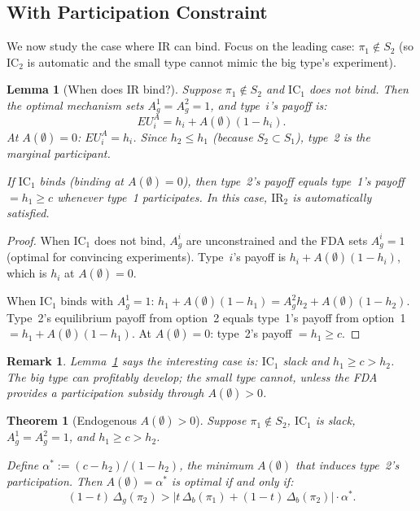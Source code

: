 \documentclass[12pt,a4paper]{article}
\newtheorem{lemma}{Lemma}
\newtheorem{theorem}{Theorem}
\newtheorem{remark}{Remark}
\begin{document}
\subsection{With Participation Constraint}
\label{sec:with_IR}

We now study the case where IR can bind. Focus on the
leading case: $\pi_1 \notin S_2$ (so $\mathrm{IC}_2$ is
automatic and the small type cannot mimic the big type's
experiment).

\begin{lemma}[When does IR bind?]\label{lem:IR_binding}
Suppose $\pi_1 \notin S_2$ and $\mathrm{IC}_1$ does not
bind. Then the optimal mechanism sets $A_g^1 = A_g^2 = 1$,
and type~$i$'s payoff is:
\[
  EU^A_i = h_i + A(\emptyset)(1 - h_i).
\]
At $A(\emptyset) = 0$: $EU^A_i = h_i$. Since
$h_2 \leq h_1$ (because $S_2 \subset S_1$), type~2 is
the marginal participant.

If $\mathrm{IC}_1$ binds (binding at $A(\emptyset) = 0$),
then type~2's payoff equals type~1's payoff $= h_1 \geq c$
whenever type~1 participates. In this case, $\mathrm{IR}_2$
is automatically satisfied.
\end{lemma}

\begin{proof}
When $\mathrm{IC}_1$ does not bind, $A_g^i$ are
unconstrained and the FDA sets $A_g^i = 1$ (optimal for
convincing experiments). Type~$i$'s payoff is
$h_i + A(\emptyset)(1-h_i)$, which is $h_i$ at
$A(\emptyset) = 0$.

When $\mathrm{IC}_1$ binds with $A_g^1 = 1$:
$h_1 + A(\emptyset)(1-h_1)
= A_g^2 h_2 + A(\emptyset)(1-h_2)$.
Type~2's equilibrium payoff from option~2 equals
type~1's payoff from option~1 $= h_1 + A(\emptyset)(1-h_1)$.
At $A(\emptyset) = 0$: type~2's payoff $= h_1 \geq c$.
\end{proof}

\begin{remark}
Lemma~\ref{lem:IR_binding} says the interesting case is:
$\mathrm{IC}_1$ slack and $h_1 \geq c > h_2$. The big type
can profitably develop; the small type cannot, unless the
FDA provides a participation subsidy through
$A(\emptyset) > 0$.
\end{remark}

\begin{theorem}[Endogenous $A(\emptyset) > 0$]
\label{thm:with_IR}
Suppose $\pi_1 \notin S_2$, $\mathrm{IC}_1$ is slack,
$A_g^1 = A_g^2 = 1$, and $h_1 \geq c > h_2$.

Define $\alpha^* := (c - h_2)/(1 - h_2)$, the minimum
$A(\emptyset)$ that induces type~2's participation. Then
$A(\emptyset) = \alpha^*$ is optimal if and only if:
\begin{equation}\label{eq:threshold_condition}
  (1-t) \, \Delta_g(\pi_2)
  > \bigl|t \, \Delta_b(\pi_1)
    + (1-t) \, \Delta_b(\pi_2)\bigr|
    \cdot \alpha^*.
\end{equation}
\end{theorem}
\end{document}
